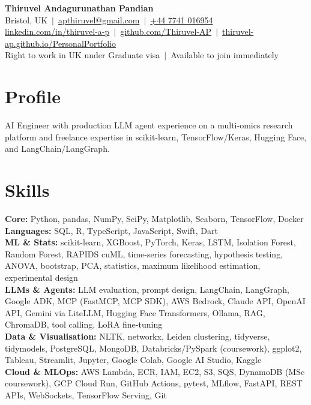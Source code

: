 \documentclass[a4paper,11pt]{article}
\begin{document}
\fontsize{11}{13.2}\selectfont

\begin{center}
  {\LARGE\bfseries Thiruvel Andagurunathan Pandian}\\[3pt]
  Bristol, UK \,$|$\, \href{mailto:apthiruvel@gmail.com}{apthiruvel@gmail.com} \,$|$\, \href{tel:+447741016954}{+44 7741 016954}\\[1pt]
\href{https://www.linkedin.com/in/thiruvel-a-p/}{linkedin.com/in/thiruvel-a-p} \,$|$\, \href{https://github.com/Thiruvel-AP}{github.com/Thiruvel-AP} \,$|$\, \href{https://thiruvel-ap.github.io/PersonalPortfolio/}{thiruvel-ap.github.io/PersonalPortfolio}\\[1pt]
  Right to work in UK under Graduate visa \,$|$\, Available to join immediately
\end{center}

\section{Profile}
AI Engineer with production LLM agent experience on a multi-omics research platform and freelance expertise in scikit-learn, TensorFlow/Keras, Hugging Face, and LangChain/LangGraph.

\section{Skills}
\textbf{Core:} Python, pandas, NumPy, SciPy, Matplotlib, Seaborn, TensorFlow, Docker\\[2pt]
\textbf{Languages:} SQL, R, TypeScript, JavaScript, Swift, Dart\\[2pt]
\textbf{ML \& Stats:} scikit-learn, XGBoost, PyTorch, Keras, LSTM, Isolation Forest, Random Forest, RAPIDS cuML, time-series forecasting, hypothesis testing, ANOVA, bootstrap, PCA, statistics, maximum likelihood estimation, experimental design\\[2pt]
\textbf{LLMs \& Agents:} LLM evaluation, prompt design, LangChain, LangGraph, Google ADK, MCP (FastMCP, MCP SDK), AWS Bedrock, Claude API, OpenAI API, Gemini via LiteLLM, Hugging Face Transformers, Ollama, RAG, ChromaDB, tool calling, LoRA fine-tuning\\[2pt]
\textbf{Data \& Visualisation:} NLTK, networkx, Leiden clustering, tidyverse, tidymodels, PostgreSQL, MongoDB, Databricks/PySpark (coursework), ggplot2, Tableau, Streamlit, Jupyter, Google Colab, Google AI Studio, Kaggle\\[2pt]
\textbf{Cloud \& MLOps:} AWS Lambda, ECR, IAM, EC2, S3, SQS, DynamoDB (MSc coursework), GCP Cloud Run, GitHub Actions, pytest, MLflow, FastAPI, REST APIs, WebSockets, TensorFlow Serving, Git
\end{document}
